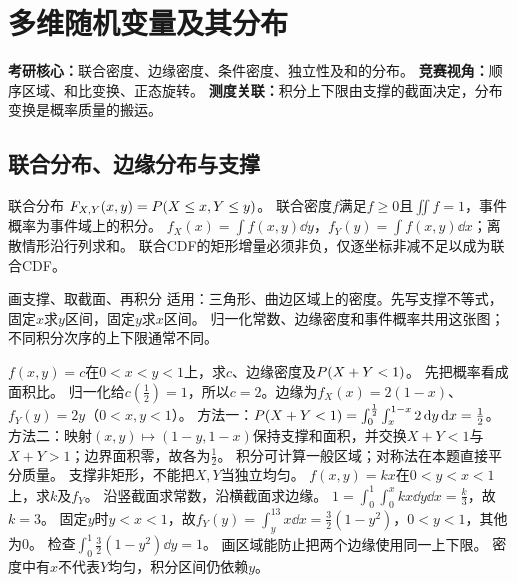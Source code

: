 \chapter{多维随机变量及其分布}\label{ch:03}
\begin{examtip}
\textbf{考研核心：}联合密度、边缘密度、条件密度、独立性及和的分布。
\textbf{竞赛视角：}顺序区域、和比变换、正态旋转。
\textbf{测度关联：}积分上下限由支撑的截面决定，分布变换是概率质量的搬运。
\end{examtip}
\section{联合分布、边缘分布与支撑}\label{sec:31}
\begin{definition}{联合分布}
$F_{X,Y}(x,y)=P(X\le x,Y\le y)$。
联合密度$f$满足$f\ge0$且$\iint f=1$，事件概率为事件域上的积分。
$f_X(x)=\int f(x,y)\dd y$，$f_Y(y)=\int f(x,y)\dd x$；离散情形沿行列求和。
联合CDF的矩形增量必须非负，仅逐坐标非减不足以成为联合CDF。
\end{definition}
\begin{method}{画支撑、取截面、再积分}
适用：三角形、曲边区域上的密度。先写支撑不等式，固定$x$求$y$区间，固定$y$求$x$区间。
归一化常数、边缘密度和事件概率共用这张图；不同积分次序的上下限通常不同。
\end{method}
{$f(x,y)=c$在$0<x<y<1$上，求$c$、边缘密度及$P(X+Y<1)$。}
{先把概率看成面积比。}
{归一化给$c(\frac{1}{2})=1$，所以$c=2$。边缘为$f_X(x)=2(1-x)$、$f_Y(y)=2y$（$0<x,y<1$）。
方法一：$P(X+Y<1)=\int_0^{\frac{1}{2}}\int_x^{1-x}2\,\mathrm d y\,\mathrm d x=\frac{1}{2}$。
方法二：映射$(x,y)\mapsto(1-y,1-x)$保持支撑和面积，并交换$X+Y<1$与$X+Y>1$；边界面积零，故各为$\frac{1}{2}$。}
{积分可计算一般区域；对称法在本题直接平分质量。}
{支撑非矩形，不能把$X,Y$当独立均匀。}
{$f(x,y)=kx$在$0<y<x<1$上，求$k$及$f_Y$。}
{沿竖截面求常数，沿横截面求边缘。}
{$1=\int_0^1\int_0^xkx\dd y\dd x=\frac{k}{3}$，故$k=3$。
固定$y$时$y<x<1$，故$f_Y(y)=\int_y^13x\dd x=\frac32(1-y^2)$，$0<y<1$，其他为0。
检查$\int_0^1\frac32(1-y^2)\dd y=1$。}
{画区域能防止把两个边缘使用同一上下限。}
{密度中有$x$不代表$Y$均匀，积分区间仍依赖$y$。}
